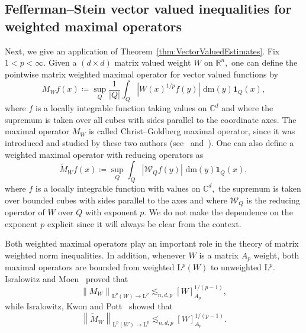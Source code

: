 \documentclass{article}
\theoremstyle{definition}
\theoremstyle{remark}
\numberwithin{equation}{section}
\newcommand{\norm}[2]{\left\|{#1}\right\|_{{#2}}}
\newcommand{\mathdm}{\,\mathrm{dm}}
\newcommand{\cW}{\mathcal{W}}
\newcommand{\reals}{\mathbb{R}}
\newcommand{\complex}{\mathbb{C}}
\newcommand{\Lp}[1]{\mathrm{L}^{#1}}
\newcommand{\1}{\mathbf{1}}
\begin{document}
    \subsection{Fefferman--Stein vector valued inequalities for weighted maximal operators}
    \label{subsec:MatrixWeightedFeffermanStein}
    Next, we give an application of Theorem~\ref{thm:VectorValuedEstimates}.
    Fix $1 < p < \infty.$
    Given a $(d \times d)$ matrix valued weight $W$ on $\reals^n,$
    one can define the pointwise matrix weighted maximal operator for vector valued functions by
    \begin{equation*}
        M_W f(x) \coloneq \sup_Q \frac{1}{|Q|} \int_Q |W(x)^{1/p}f(y)|\, \mathdm(y) \1_Q(x),
    \end{equation*}
    where $f$ is a locally integrable function taking values on $\complex^d$
    and where the supremum is taken over all cubes with sides parallel to the coordinate axes.
    The maximal operator $M_W$ is called Christ--Goldberg maximal operator,
    since it was introduced and studied by these two authors (see~\cite{Christ_Goldberg_2001} and~\cite{Goldberg_2003}).
    One can also define a weighted maximal operator with reducing operators as
    \begin{equation*}
        \widetilde{M}_W f(x) \coloneq \sup_Q \int_Q |\cW_Q f(y)|\, \mathdm(y) \1_Q(x),
    \end{equation*}
    where $f$ is a locally integrable function with values on $\complex^d,$
    the supremum is taken over bounded cubes with sides parallel to the axes
    and where $\cW_Q$ is the reducing operator of $W$ over $Q$ with exponent $p.$
    We do not make the dependence on the exponent $p$ explicit since it will always be clear from the context.
    
    Both weighted maximal operators play an important role in the theory of matrix weighted norm inequalities.
    In addition, whenever $W$ is a matrix $A_p$ weight, both maximal operators are bounded
    from weighted $\Lp{p}(W)$ to unweighted $\Lp{p}.$
    Isralowitz and Moen~\cite{Isralowitz_Moen_2019} proved that
    \begin{equation}
        \label{eq:PWMaximalOperatorBound}
        \norm{M_W}{\Lp{p}(W)\rightarrow\Lp{p}} \lesssim_{n,d,p} [W]_{A_p}^{1/(p-1)},
    \end{equation}
    while Isralowitz, Kwon and Pott~\cite{Isralowitz_Kwon_Pott2017} showed that
    \begin{equation*}
        \norm{\widetilde{M}_W}{\Lp{p}(W)\rightarrow\Lp{p}} \lesssim_{n,d,p} [W]_{A_p}^{1/(p-1)}.
    \end{equation*}
\end{document}
